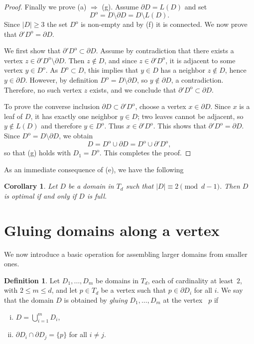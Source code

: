 \documentclass[a4paper, 11pt]{article}
\numberwithin{equation}{section}
\newtheorem{corollary}[theorem]{Corollary}
\theoremstyle{definition}
\newtheorem{definition}[theorem]{Definition}
\theoremstyle{remark}
\begin{document}
\begin{proof}
\smallskip



Finally we prove (a) $\Rightarrow$ (g). Assume $\partial D = L(D)$ and set
\[
 D^{\mathrm{o} }  = D\setminus\partial D = D\setminus L(D).
\]
Since $|D|\ge 3$ the set $D^{\mathrm{o} } $ is non-empty and by (f) it is connected. We now prove  that $\partial'D^{\mathrm{o} }  = \partial D$.

\smallskip

We first show that $\partial' D^{\mathrm{o} }  \subset \partial D$.  Assume by contradiction that there exists a vertex $z \in \partial' D^{\mathrm{o} }  \setminus \partial D$.
Then $z \notin D$, and since $z \in \partial' D^{\mathrm{o} } $, it is adjacent to some vertex $y \in D^{\mathrm{o} } $.
As $D^{\mathrm{o} }  \subset D$, this implies that $y \in D$ has a neighbor $z \notin D$, hence $y \in \partial D$. However, by definition $D^{\mathrm{o} }  = D \setminus \partial D$,
so $y \notin \partial D$, a contradiction. Therefore, no such vertex $z$ exists, and we conclude that $\partial' D^{\mathrm{o} }  \subset \partial D$.

\smallskip

To prove the converse inclusion $\partial D \subset \partial' D^{\mathrm{o} } $, choose a vertex $x\in\partial D$.
Since $x$ is a leaf of $D$, it has exactly one neighbor $y\in D$; two leaves cannot be adjacent, so $y\notin L(D)$ and therefore $y\in D^{\mathrm{o} } $. Thus $x\in\partial'D^{\mathrm{o} } $.
This shows that $\partial' D^{\mathrm{o}} = \partial D$. 
Since $D^{\mathrm{o}} = D\setminus \partial D$, we obtain
\[
D = D^{\mathrm{o}} \cup \partial D
  = D^{\mathrm{o}} \cup \partial' D^{\mathrm{o}},
\]
so that (g) holds with $D_1 = D^{\mathrm{o}}$. 
This completes the proof.
\end{proof}

\medskip

As an immediate consequence of (e), we have the following 
\begin{corollary}  
Let $D$ be a domain in $T_d$ such that $|D| \equiv 2 \pmod{d-1}$. Then $D$ is optimal if and only if $D$ is full.
\end{corollary}

 
 
\section{Gluing domains along a vertex}
\label{sec.gluing}

We now introduce a basic operation for assembling larger domains from smaller ones.
\begin{definition}
Let $D_1,\dots,D_m$ be domains in $T_d$, each of cardinality at least~$2$,  with $2 \leq m\leq d$, and let
$p\in T_d$ be a vertex such that $p\in \partial D_i$ for all $i$.  
We say that the domain $D$ is obtained by \emph{gluing} $D_1,\dots,D_m$ at the vertex ~$p$ if
\begin{enumerate}[(i)]
\item $D=\bigcup_{i=1}^m D_i$,
\item $\partial D_i\cap \partial D_j=\{p\}$ for all $i\ne j$.
\end{enumerate}
\end{definition}
\end{document}
